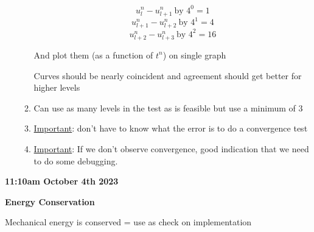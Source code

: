 \begin{itemize}
\begin{enumerate}
         \[ u_l^n - u_{l+1}^n\ \text{by } 4^0=1\]
         \[ u_{l+1}^n - u_{l+2}^n\ \text{by } 4^1=4\]
         \[ u_{l+2}^n - u_{l+3}^n\ \text{by } 4^2=16\]

         And plot them (as a function of $t^n$) on single graph

         \vspace{10px}

         Curves should be nearly coincident and agreement should get better for higher levels

         \item Can use as many levels in the test as is feasible but use a minimum of 3

         \item \underline{Important}: don't have to know what the error is to do a convergence test

         \item \underline{Important}: If we don't observe convergence, good indication that we need to do some debugging.
     \end{enumerate}

\end{itemize}


\textbf{11:10am October 4th 2023}

\textbf{Energy Conservation}

Mechanical energy is conserved = use as check on implementation

